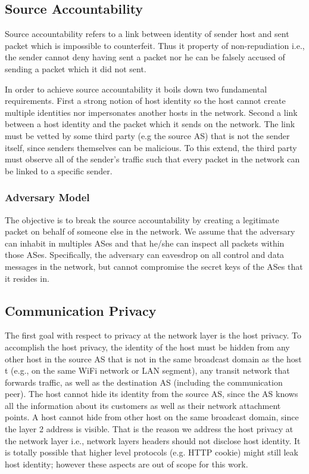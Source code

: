 \subsection{Source Accountability}
Source accountability refers to a link between identity of sender host and sent packet which is impossible to counterfeit. Thus it property of non-repudiation i.e., the sender cannot deny having sent a packet nor he can be falsely accused of sending a packet which it did not sent.

In order to achieve source accountability it boils down two fundamental requirements. First a strong notion of host identity so the host cannot create multiple identities nor impersonates another hosts in the network. Second a link between a host identity and the packet which it sends on the network. The link must be vetted by some third party (e.g the source AS) that is not the sender itself, since senders themselves can be malicious. To this extend, the third party must observe all of the sender’s traffic such that every packet in the network can be linked to a specific sender.

\subsubsection{Adversary Model} 

The objective is to break the source accountability by creating a legitimate packet on behalf of someone else in the network. We assume that the adversary can inhabit in multiples ASes and that he/she can inspect all packets within those ASes. Specifically, the adversary can eavesdrop on all control and data messages in the network, but cannot compromise the secret keys of the ASes that it resides in.

\subsection{Communication Privacy}
The first goal with respect to privacy at the network layer is the host privacy. To accomplish the host privacy, the identity of the host must be hidden from any other host in the source AS that is not in the same broadcast domain as the host t (e.g., on the same WiFi network or LAN segment), any transit network that forwards traffic, as well as the destination AS (including the communication peer). The host cannot hide its identity from the source AS, since the AS knows all the information about its customers as well as their network attachment points. A host cannot hide from other host on the same broadcast domain, since the layer 2 address is visible. That is the reason we address the host privacy at the network layer i.e., network layers headers should not disclose host identity. It is totally possible that higher level protocols (e.g. HTTP cookie) might still leak host identity; however these aspects are out of scope for this work.

